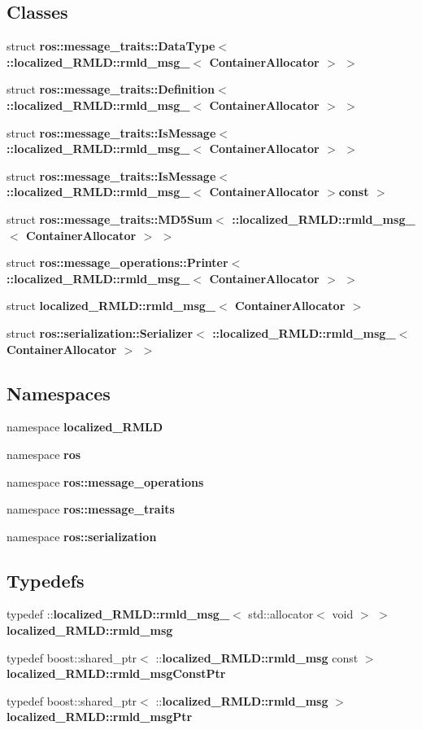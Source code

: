\subsection*{Classes}
\begin{DoxyCompactItemize}
\item 
struct {\bf ros::message\_\-traits::DataType$<$ ::localized\_\-RMLD::rmld\_\-msg\_\-$<$ ContainerAllocator $>$ $>$}
\item 
struct {\bf ros::message\_\-traits::Definition$<$ ::localized\_\-RMLD::rmld\_\-msg\_\-$<$ ContainerAllocator $>$ $>$}
\item 
struct {\bf ros::message\_\-traits::IsMessage$<$ ::localized\_\-RMLD::rmld\_\-msg\_\-$<$ ContainerAllocator $>$ $>$}
\item 
struct {\bf ros::message\_\-traits::IsMessage$<$ ::localized\_\-RMLD::rmld\_\-msg\_\-$<$ ContainerAllocator $>$const  $>$}
\item 
struct {\bf ros::message\_\-traits::MD5Sum$<$ ::localized\_\-RMLD::rmld\_\-msg\_\-$<$ ContainerAllocator $>$ $>$}
\item 
struct {\bf ros::message\_\-operations::Printer$<$ ::localized\_\-RMLD::rmld\_\-msg\_\-$<$ ContainerAllocator $>$ $>$}
\item 
struct {\bf localized\_\-RMLD::rmld\_\-msg\_\-$<$ ContainerAllocator $>$}
\item 
struct {\bf ros::serialization::Serializer$<$ ::localized\_\-RMLD::rmld\_\-msg\_\-$<$ ContainerAllocator $>$ $>$}
\end{DoxyCompactItemize}
\subsection*{Namespaces}
\begin{DoxyCompactItemize}
\item 
namespace {\bf localized\_\-RMLD}
\item 
namespace {\bf ros}
\item 
namespace {\bf ros::message\_\-operations}
\item 
namespace {\bf ros::message\_\-traits}
\item 
namespace {\bf ros::serialization}
\end{DoxyCompactItemize}
\subsection*{Typedefs}
\begin{DoxyCompactItemize}
\item 
typedef ::{\bf localized\_\-RMLD::rmld\_\-msg\_\-}$<$ std::allocator$<$ void $>$ $>$ {\bf localized\_\-RMLD::rmld\_\-msg}
\item 
typedef boost::shared\_\-ptr$<$ ::{\bf localized\_\-RMLD::rmld\_\-msg} const  $>$ {\bf localized\_\-RMLD::rmld\_\-msgConstPtr}
\item 
typedef boost::shared\_\-ptr$<$ ::{\bf localized\_\-RMLD::rmld\_\-msg} $>$ {\bf localized\_\-RMLD::rmld\_\-msgPtr}
\end{DoxyCompactItemize}
